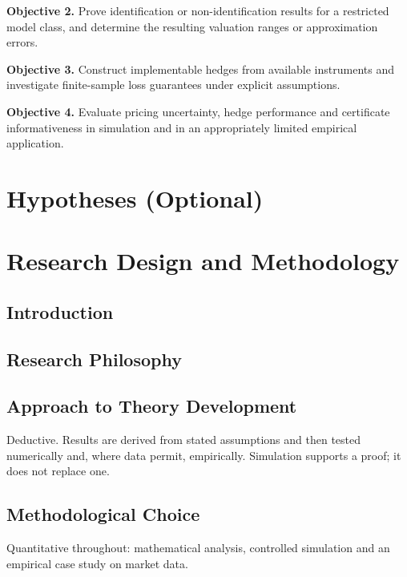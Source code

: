 \documentclass[12pt,final]{article}
\begin{document}
	\textbf{Objective 2.} Prove identification or non-identification results for
	a restricted model class, and determine the resulting valuation ranges or
	approximation errors.

	\textbf{Objective 3.} Construct implementable hedges from available
	instruments and investigate finite-sample loss guarantees under explicit
	assumptions.

	\textbf{Objective 4.} Evaluate pricing uncertainty, hedge performance and
	certificate informativeness in simulation and in an appropriately limited
	empirical application.

	\section{Hypotheses (Optional)} %

	\section{Research Design and Methodology} %

	\subsection{Introduction}

	\subsection{Research Philosophy}

	\subsection{Approach to Theory Development}
	Deductive. Results are derived from stated assumptions and then tested
	numerically and, where data permit, empirically. Simulation supports a
	proof; it does not replace one.

	\subsection{Methodological Choice}
	Quantitative throughout: mathematical analysis, controlled simulation and
	an empirical case study on market data.
\end{document}
